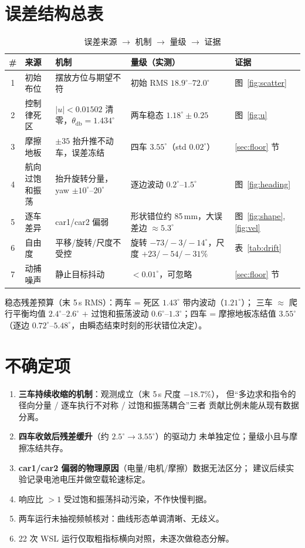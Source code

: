 \documentclass[11pt,a4paper]{ctexart}
\newcommand{\degC}{^\circ}
\begin{document}
\section{误差结构总表}

\begin{table}[H]
\centering\small
\caption{误差来源 $\to$ 机制 $\to$ 量级 $\to$ 证据}
\label{tab:budget}
\begin{tabular}{clp{4.6cm}p{3.4cm}l}
\toprule
\# & 来源 & 机制 & 量级（实测） & 证据 \\
\midrule
1 & 初始布位 & 摆放方位与期望不符 & 初始 RMS $18.9\degC$--$72.0\degC$ & 图~\ref{fig:scatter} \\
2 & 控制律死区 & $|u|<0.01502$ 清零，$\theta_{\mathrm{db}}=1.434\degC$ & 两车稳态 $1.18\degC\pm0.25$ & 图~\ref{fig:u} \\
3 & 摩擦地板 & $\pm35$ 抬升推不动车，误差冻结 & 四车 $3.55\degC$（std $0.02\degC$） & \ref{sec:floor} 节 \\
4 & 航向过饱和振荡 & 抬升旋转分量，yaw $\pm10\degC$--$20\degC$ & 逐边波动 $0.2\degC$--$1.5\degC$ & 图~\ref{fig:heading} \\
5 & 逐车差异 & car1/car2 偏弱 & 形状错位约 85\,mm，大误差边 $\approx5.3\degC$ & 图~\ref{fig:shape},\ref{fig:vel} \\
6 & 自由度 & 平移/旋转/尺度不受控 & 旋转 $-73/-3/-14\degC$，尺度 $+23/-54/-31\%$ & 表~\ref{tab:drift} \\
7 & 动捕噪声 & 静止目标抖动 & $<0.01\degC$，可忽略 & \ref{sec:floor} 节 \\
\bottomrule
\end{tabular}
\end{table}

稳态残差预算（末 5\,s RMS）：两车 = 死区 $1.43\degC$ 带内波动（$1.21\degC$）；
三车 $\approx$ 爬行平衡均值 $2.4\degC$--$2.6\degC$ $+$ 过饱和振荡波动
$0.6\degC$--$1.3\degC$；四车 = 摩擦地板冻结值 $3.55\degC$
（逐边 $0.72\degC$--$5.48\degC$，由瞬态结束时刻的形状错位决定）。

\section{不确定项}

\begin{enumerate}
  \item \textbf{三车持续收缩的机制}：观测成立（末 5\,s 尺度 $-18.7\%$），
        但“多边求和指令的径向分量 / 逐车执行不对称 / 过饱和振荡耦合”三者
        贡献比例未能从现有数据分离。
  \item \textbf{四车收敛后残差缓升}（约 $2.5\degC\to3.55\degC$）的驱动力
        未单独定位；量级小且与摩擦冻结共存。
  \item \textbf{car1/car2 偏弱的物理原因}（电量/电机/摩擦）数据无法区分；
        建议后续实验记录电池电压并做空载轮速标定。
  \item 响应比 $>1$ 受过饱和振荡抖动污染，不作快慢判据。
  \item 两车运行未抽视频帧核对：曲线形态单调清晰、无歧义。
  \item 22 次 WSL 运行仅取粗指标横向对照，未逐次做稳态分解。
\end{enumerate}
\end{document}
